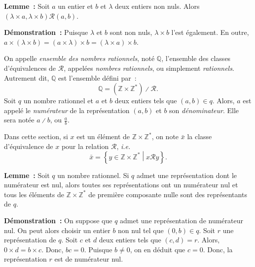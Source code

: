     \done

\medskip

\noindent\textbf{Lemme :} Soit $a$ un entier et $b$ et $\lambda$ deux entiers non nuls. 
    Alors $(\lambda \times a, \lambda \times b) \mathrel{\mathcal{R}} (a, b)$.

\medskip

\noindent\textbf{Démonstration :} Puisque $\lambda$ et $b$ sont non nuls, $\lambda \times b$ l'est également.
    En outre, $a \times (\lambda \times b) = (a \times \lambda) \times b = (\lambda \times a) \times b$.

    \done

\medskip

On appelle \emph{ensemble des nombres rationnels}, noté $\mathbb{Q}$, l'ensemble des classes d'équivalences de $\mathcal{R}$, appelées \emph{nombres rationnels}, ou simplement \emph{rationnels}. 
  
Autrement dit, $\mathbb{Q}$ est l'ensemble défini par : 
\begin{equation*}
    \mathbb{Q} = (\mathbb{Z} \times \mathbb{Z}^*) \divslash \mathcal{R} .
\end{equation*}
Soit $q$ un nombre rationnel et $a$ et $b$ deux entiers tels que $(a, b) \in q$. 
Alors, $a$ est appelé le \emph{numérateur} de la représentation $(a, b)$ et $b$ son \emph{dénominateur}.
 
Elle sera notée $a \divslash b$, ou $\frac{a}{b}$.
\sindex[isy]{$\divslash$}

Dans cette section, si $x$ est un élément de $\mathbb{Z} \times \mathbb{Z}^*$, on note $\bar{x}$ la classe d'équivalence de $x$ pour la relation $\mathcal{R}$, \emph{i.e.}
\begin{equation*}
    \bar{x} = \left\lbrace y \in \mathbb{Z} \times \mathbb{Z}^* \middle\vert x \mathrel{\mathcal{R}} y \right\rbrace .
\end{equation*}

\medskip

\noindent\textbf{Lemme :} Soit $q$ un nombre rationnel. 
Si $q$ admet une représentation dont le numérateur est nul, alors toutes ses représentations ont un numérateur nul et tous les éléments de $\mathbb{Z} \times \mathbb{Z}^*$ de première composante nulle sont des représentants de $q$. 

\medskip

\noindent\textbf{Démonstration :} On suppose que $q$ admet une représentation de numérateur nul. 
    On peut alors choisir un entier $b$ non nul tel que $(0, b) \in q$. 
    Soit $r$ une représentation de $q$.
    Soit $c$ et $d$ deux entiers tels que $(c, d)  = r$.
    Alors, $0 \times d = b \times c$.
    Donc, $b c = 0$.
    Puisque $b \neq 0$, on en déduit que $c = 0$.
    Donc, la représentation $r$ est de numérateur nul.

